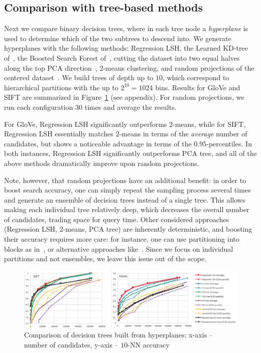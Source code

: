\documentclass[11pt]{article}
\begin{document}
\subsection{Comparison with tree-based methods}

Next we compare binary decision trees, where in each tree node a \emph{hyperplane} is used to determine which of the two subtrees to descend into. We generate hyperplanes with the following methods: Regression LSH, the Learned KD-tree of~\cite{cayton2008learning}, the Boosted Search Forest of~\cite{li2011learning}, cutting the dataset into two equal halves along the top PCA direction~\cite{sproull1991refinements,kumar2008good},
$2$-means clustering, and random projections of the centered dataset~\cite{dasgupta2013randomized,keivani2018improved}.
We build trees of depth up to $10$, which correspond to hierarchical partitions with the up to $2^{10} = 1024$ bins. Results for GloVe and SIFT are summarized in Figure~\ref{piotr_fig:trees_results} (see appendix).
For random projections, we run each configuration $30$ times and average the results.

For GloVe, Regression LSH significantly outperforms $2$-means,
while for SIFT, Regression LSH essentially matches $2$-means in terms of the \emph{average} number of candidates,
but shows a noticeable advantage in terms of the $0.95$-percentiles.
In both instances, Regression LSH significantly outperforms PCA tree, and all of the above methods
dramatically improve upon random projections.

Note, however, that random projections have an additional benefit: in order to boost search
accuracy, one can simply repeat the sampling process several times and generate an ensemble of
decision trees instead of a single tree. This allows making each individual tree relatively deep,
which decreases the overall number of candidates, trading space for query time. Other considered approaches (Regression LSH, $2$-means, PCA tree) are inherently deterministic, and boosting their accuracy requires more care:
for instance, one can use partitioning into blocks as in~\cite{jegou2011product}, or alternative approaches like~\cite{keivani2018improved}. Since we focus
on individual partitions and not ensembles, we leave this issue out of the scope.

\begin{figure}%
    \centering
    \includegraphics[width=\textwidth]{submissions/Piotr2023/fig/plot_trees.png}

    \caption{Comparison of decision trees built from hyperplanes: x-axis -- number of candidates, y-axis -- $10$-NN accuracy}%
    \label{piotr_fig:trees_results}
\end{figure}
\end{document}
